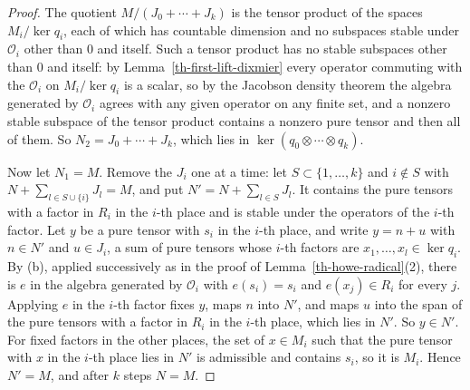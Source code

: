 \begin{proof}
The quotient $M/(J_0+\cdots+J_k)$ is the tensor product of the spaces
$M_i/\ker q_i$, each of which has countable dimension and no subspaces stable
under $\mathcal O_i$ other than $0$ and itself. Such a tensor product has no
stable subspaces other than $0$ and itself: by
Lemma~\ref{th-first-lift-dixmier} every operator commuting with the
$\mathcal O_i$ on $M_i/\ker q_i$ is a scalar, so by the Jacobson density
theorem \cite[\S11]{Lam01} the algebra generated by $\mathcal O_i$ agrees with
any given operator on any finite set, and a nonzero stable subspace of the
tensor product contains a nonzero pure tensor and then all of them. So
$N_2=J_0+\cdots+J_k$, which lies in $\ker(q_0\otimes\cdots\otimes q_k)$.

Now let $N_1=M$. Remove the $J_i$ one at a time: let $S\subset\{1,\ldots,k\}$
and $i\notin S$ with $N+\sum_{l\in S\cup\{i\}}J_l=M$, and put
$N'=N+\sum_{l\in S}J_l$. It contains the pure tensors with a factor in $R_i$
in the $i$-th place and is stable under the operators of the $i$-th factor.
Let $y$ be a pure tensor with $s_i$ in the $i$-th place, and write $y=n+u$
with $n\in N'$ and $u\in J_i$, a sum of pure tensors whose $i$-th factors are
$x_1,\ldots,x_l\in\ker q_i$. By (b), applied successively as in the proof of
Lemma~\ref{th-howe-radical}(2), there is $e$ in the algebra generated by
$\mathcal O_i$ with $e(s_i)=s_i$ and $e(x_j)\in R_i$ for every $j$. Applying
$e$ in the $i$-th factor fixes $y$, maps $n$ into $N'$, and maps $u$ into the
span of the pure tensors with a factor in $R_i$ in the $i$-th place, which
lies in $N'$. So $y\in N'$. For fixed factors in the other places, the set of
$x\in M_i$ such that the pure tensor with $x$ in the $i$-th place lies in $N'$
is admissible and contains $s_i$, so it is $M_i$. Hence $N'=M$, and after $k$
steps $N=M$.
\end{proof}


